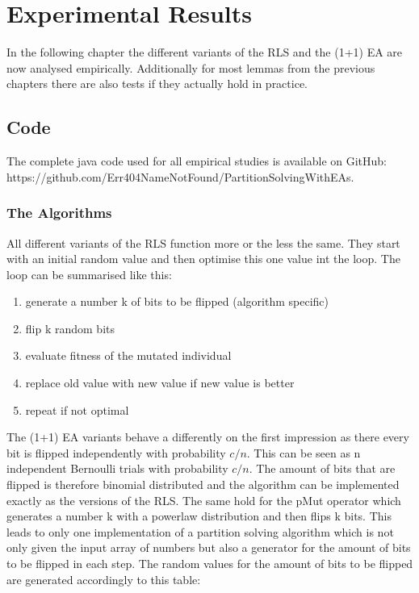 \chapter{Experimental Results}\label{ch:expRes}

In the following chapter the different variants of the RLS and the (1+1) EA are now analysed empirically.
Additionally for most lemmas from the previous chapters there are also tests if they actually hold in practice.

\section{Code}
The complete java code used for all empirical studies is available on GitHub:\newline
https://github.com/Err404NameNotFound/PartitionSolvingWithEAs.\newline
\subsection{The Algorithms}
All different variants of the RLS function more or the less the same. They start with an initial random value and then optimise this one value int the loop. The loop can be summarised like this:
\begin{enumerate}
      \item generate a number k of bits to be flipped (algorithm specific)
      \item flip k random bits
      \item evaluate fitness of the mutated individual
      \item replace old value with new value if new value is better
      \item repeat if not optimal
\end{enumerate}
The (1+1) EA variants behave a differently on the first impression as there every bit is flipped independently with probability $c/n$. This can be seen as n independent Bernoulli trials with probability $c/n$. The amount of bits that are flipped is therefore binomial distributed and the algorithm can be implemented exactly as the versions of the RLS. The same hold for the pMut operator which generates a number k with a powerlaw distribution and then flips k bits. This leads to only one implementation of a partition solving algorithm which is not only given the input array of numbers but also a generator for the amount of bits to be flipped in each step. The random values for the amount of bits to be flipped are generated accordingly to this table:

